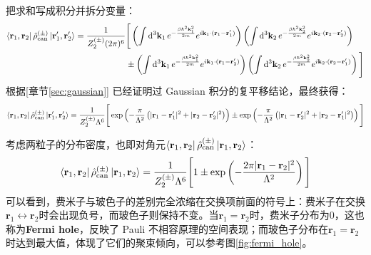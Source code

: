 把求和写成积分并拆分变量：
\[\begin{aligned}
\bra{\mathbf{r}_1,\mathbf{r}_2}\hat{\rho}_{\rm can}^{(\pm)}\ket{\mathbf{r}_1',\mathbf{r}_2'}
&=\frac{1}{Z_2^{(\pm)}(2\pi)^6}\Bigg[
\left(\int \dd[3]{\mathbf{k}_1}e^{-\frac{\beta\hbar^2\mathbf{k}_1^2}{2m}}e^{i\mathbf{k}_1\cdot(\mathbf{r}_1-\mathbf{r}_1')}\right)
\left(\int \dd[3]{\mathbf{k}_2}e^{-\frac{\beta\hbar^2\mathbf{k}_2^2}{2m}}e^{i\mathbf{k}_2\cdot(\mathbf{r}_2-\mathbf{r}_2')}\right)\\
&\qquad\qquad\qquad\pm
\left(\int \dd[3]{\mathbf{k}_1}e^{-\frac{\beta\hbar^2\mathbf{k}_1^2}{2m}}e^{i\mathbf{k}_1\cdot(\mathbf{r}_1-\mathbf{r}_2')}\right)
\left(\int \dd[3]{\mathbf{k}_2}e^{-\frac{\beta\hbar^2\mathbf{k}_2^2}{2m}}e^{i\mathbf{k}_2\cdot(\mathbf{r}_2-\mathbf{r}_1')}\right)
\Bigg]
\end{aligned}\]
根据[章节\ref{sec:gaussian}] 已经证明过 Gaussian 积分的复平移结论，最终获得：
\[\bra{\mathbf{r}_1,\mathbf{r}_2}\hat{\rho}_{\rm can}^{(\pm)}\ket{\mathbf{r}_1',\mathbf{r}_2'}=\frac{1}{Z_2^{(\pm)}\Lambda^6}\Bigg[\exp\left(-\frac{\pi}{\Lambda^2}\left(|\mathbf{r}_1-\mathbf{r}_1'|^2+|\mathbf{r}_2-\mathbf{r}_2'|^2\right)\right)\pm\exp\left(-\frac{\pi}{\Lambda^2}\left(|\mathbf{r}_1-\mathbf{r}_2'|^2+|\mathbf{r}_2-\mathbf{r}_1'|^2\right)\right)\Bigg]\]

考虑两粒子的分布密度，也即对角元$\bra{\mathbf{r}_1,\mathbf{r}_2}\hat{\rho}_{\rm can}^{(\pm)}\ket{\mathbf{r}_1,\mathbf{r}_2}$：
\[\bra{\mathbf{r}_1,\mathbf{r}_2}\hat{\rho}_{\rm can}^{(\pm)}\ket{\mathbf{r}_1,\mathbf{r}_2}=\frac{1}{Z_2^{(\pm)}\Lambda^6}\Bigg[1\pm\exp\left(-\frac{2\pi|\mathbf{r}_1-\mathbf{r}_2|^2}{\Lambda^2}\right)\Bigg]\]
可以看到，费米子与玻色子的差别完全浓缩在交换项前面的符号上：费米子在交换$\mathbf{r}_1\leftrightarrow \mathbf{r}_2$时会出现负号，而玻色子则保持不变。当$\mathbf{r}_1=\mathbf{r}_2$时，费米子分布为0，这也称为\textbf{Fermi hole}，反映了 Pauli 不相容原理的空间表现；而玻色子分布在$\mathbf{r}_1=\mathbf{r}_2$时达到最大值，体现了它们的聚束倾向，可以参考图\ref{fig:fermi_hole}。

